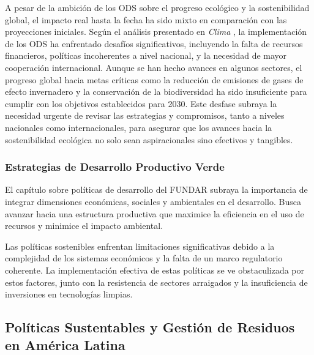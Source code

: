 \documentclass[main.tex]{subfiles}
\begin{document}
A pesar de la ambición de los ODS sobre el progreso ecológico y la sostenibilidad global, el impacto real hasta la fecha ha sido mixto en comparación con las proyecciones iniciales. Según el análisis presentado en \textit{Clima} \cite{clima2022book}, la implementación de los ODS ha enfrentado desafíos significativos, incluyendo la falta de recursos financieros, políticas incoherentes a nivel nacional, y la necesidad de mayor cooperación internacional. Aunque se han hecho avances en algunos sectores, el progreso global hacia metas críticas como la reducción de emisiones de gases de efecto invernadero y la conservación de la biodiversidad ha sido insuficiente para cumplir con los objetivos establecidos para 2030. Este desfase subraya la necesidad urgente de revisar las estrategias y compromisos, tanto a niveles nacionales como internacionales, para asegurar que los avances hacia la sostenibilidad ecológica no solo sean aspiracionales sino efectivos y tangibles.

\subsubsection{Estrategias de Desarrollo Productivo Verde}
El capítulo sobre políticas de desarrollo del FUNDAR subraya la importancia de integrar dimensiones económicas, sociales y ambientales en el desarrollo. Busca avanzar hacia una estructura productiva que maximice la eficiencia en el uso de recursos y minimice el impacto ambiental. 

Las políticas sostenibles enfrentan limitaciones significativas debido a la complejidad de los sistemas económicos y la falta de un marco regulatorio coherente. La implementación efectiva de estas políticas se ve obstaculizada por estos factores, junto con la resistencia de sectores arraigados y la insuficiencia de inversiones en tecnologías limpias.

\subsection{Políticas Sustentables y Gestión de Residuos en América Latina}
\end{document}
